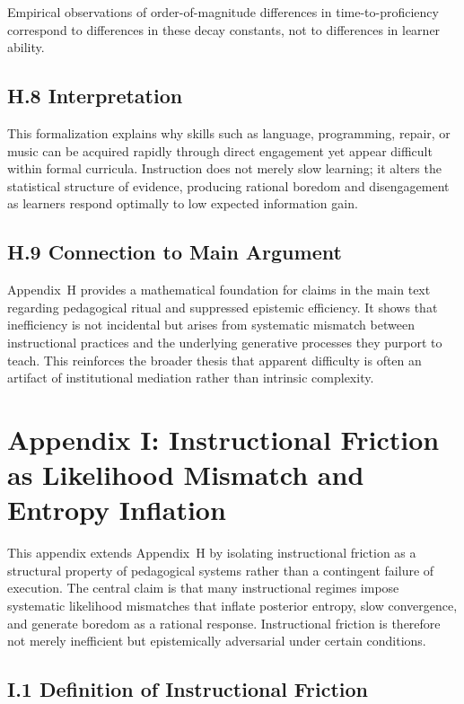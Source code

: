 \documentclass[11pt]{article}
\begin{document}
Empirical observations of order-of-magnitude differences in time-to-proficiency correspond to differences in these decay constants, not to differences in learner ability.

\subsection{H.8 Interpretation}

This formalization explains why skills such as language, programming, repair, or music can be acquired rapidly through direct engagement yet appear difficult within formal curricula. Instruction does not merely slow learning; it alters the statistical structure of evidence, producing rational boredom and disengagement as learners respond optimally to low expected information gain.

\subsection{H.9 Connection to Main Argument}

Appendix~H provides a mathematical foundation for claims in the main text regarding pedagogical ritual and suppressed epistemic efficiency. It shows that inefficiency is not incidental but arises from systematic mismatch between instructional practices and the underlying generative processes they purport to teach. This reinforces the broader thesis that apparent difficulty is often an artifact of institutional mediation rather than intrinsic complexity.

\section{Appendix I: Instructional Friction as Likelihood Mismatch and Entropy Inflation}
\label{app:likelihood-detailed}

This appendix extends Appendix~H by isolating instructional friction as a structural property of pedagogical systems rather than a contingent failure of execution. The central claim is that many instructional regimes impose systematic likelihood mismatches that inflate posterior entropy, slow convergence, and generate boredom as a rational response. Instructional friction is therefore not merely inefficient but epistemically adversarial under certain conditions.

\subsection{I.1 Definition of Instructional Friction}
\end{document}
